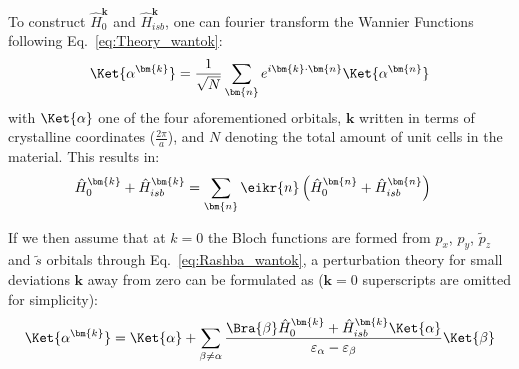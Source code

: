 To construct $\hat{H}_0^{\bm{k}}$ and $\hat{H}_{isb}^{\bm{k}}$, one can fourier transform the Wannier Functions following Eq.~\ref{eq:Theory_wantok}:
\begin{equation}
	\label{eq:Rashba_wantok}
	\Ket{\alpha^{\bm{k}}} = \frac{1}{\sqrt{N}}\sum_{\bm{n}} e^{i \bm{k}\cdot \bm{n}}\Ket{\alpha^{\bm{n}}}
\end{equation}
with $\Ket{\alpha}$ one of the four aforementioned orbitals, $\bm{k}$ written in terms of crystalline coordinates ($\frac{2\pi}{a}$), and $N$ denoting the total amount of unit cells in the material. This results in:
\begin{align}
	\label{eq:Rashba_wantokH}
	\hat{H}_0^{\bm{k}} + \hat{H}_{isb}^{\bm{k}} &= \sum_{\bm{n}} \eikr{n} \left(\hat{H}_0^{\bm{n}} + \hat{H}_{isb}^{\bm{n}}\right)%
\end{align}

If we then assume that at $k=0$ the Bloch functions are formed from $p_x$, $p_y$, $\tilde{p}_z$ and $\tilde{s}$ orbitals through Eq.~\ref{eq:Rashba_wantok}, a perturbation theory for small deviations $\bm{k}$ away from zero can be formulated as ($\bm{k}=0$ superscripts are omitted for simplicity):
\begin{equation}
	\Ket{\alpha^{\bm{k}}}=\Ket{\alpha} + \sum_{\beta \neq \alpha} \frac{\Bra{\beta} \hat{H}_0^{\bm{k}} + \hat{H}_{isb}^{\bm{k}} \Ket{\alpha}}{\varepsilon_{\alpha} - \varepsilon_{\beta}} \Ket{\beta}
\end{equation}

